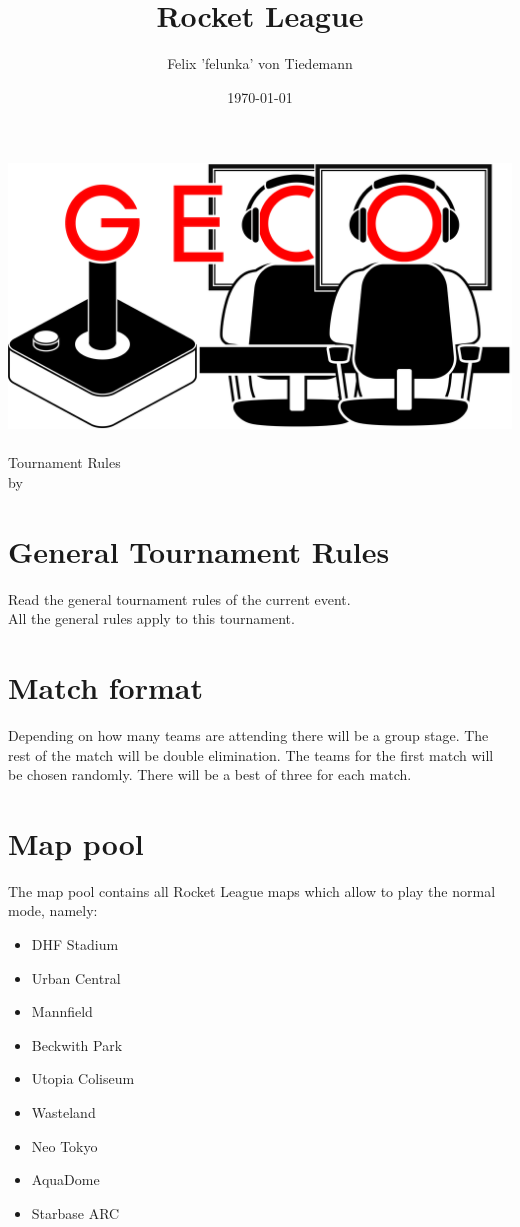\documentclass{article}
\title{Rocket League}
\author{Felix 'felunka' von Tiedemann}
\date{\today}
\begin{document}
\makeatletter
\begin{titlepage}
\centering
\includegraphics[scale=0.075]{../img/GECo.png}\\
\LARGE \@title\\ Tournament Rules\\ \normalsize by \@author\\ \@date
\end{titlepage}
\makeatother


\clearpage

\tableofcontents
\clearpage

\section{General Tournament Rules}
Read the general tournament rules of the current event.\\
All the general rules apply to this tournament.

\section{Match format}
Depending on how many teams are attending there will be a group stage. The rest of the match will
be double elimination. The teams for the first match will be chosen randomly. There will be a best of
three for each match.

\section{Map pool}
The map pool contains all Rocket League maps which allow to play the normal mode, namely:
\begin{itemize}
  \item DHF Stadium
  \item Urban Central
  \item Mannfield
  \item Beckwith Park
  \item Utopia Coliseum
  \item Wasteland
  \item Neo Tokyo
  \item AquaDome
  \item Starbase ARC
\end{itemize}
\end{document}
